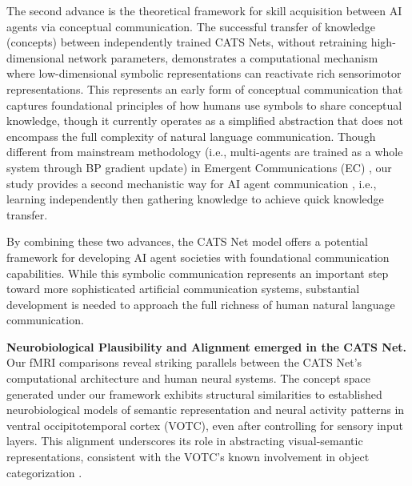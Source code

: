 \documentclass[pdflatex,sn-mathphys-num,lineno]{sn-jnl}%
\begin{document}
\begin{CJK}{UTF8}{gbsn}
The second advance is the theoretical framework for skill acquisition between AI agents via conceptual communication. The successful transfer of knowledge (concepts) between independently trained CATS Nets, without retraining high-dimensional network parameters, demonstrates a computational mechanism where low-dimensional symbolic representations can reactivate rich sensorimotor representations. This represents an early form of conceptual communication that captures foundational principles of how humans use symbols to share conceptual knowledge, though it currently operates as a simplified abstraction that does not encompass the full complexity of natural language communication. Though different from mainstream methodology (i.e., multi-agents are trained as a whole system through BP gradient update) in Emergent Communications (EC) \cite{foerster_learning_2016,jaques_social_2019,wang_emergence_2024}, our study provides a second mechanistic way for AI agent communication \cite{wieczorek_framework_2024}, i.e., learning independently then gathering knowledge to achieve quick knowledge transfer.

By combining these two advances, the CATS Net model offers a potential framework for developing AI agent societies with foundational communication capabilities. While this symbolic communication represents an important step toward more sophisticated artificial communication systems, substantial development is needed to approach the full richness of human natural language communication. 

\textbf{Neurobiological Plausibility and Alignment emerged in the CATS Net.} Our fMRI comparisons reveal striking parallels between the CATS Net's computational architecture and human neural systems. The concept space generated under our framework exhibits structural similarities to established neurobiological models of semantic representation \cite{binder_toward_2016} and neural activity patterns in ventral occipitotemporal cortex (VOTC), even after controlling for sensory input layers. This alignment underscores its role in abstracting visual-semantic representations, consistent with the VOTC's known involvement in object categorization \cite{ungerleider_what_1994}.


\end{CJK}
\end{document}
